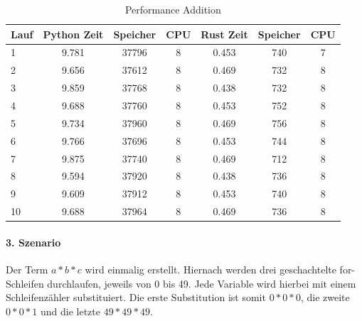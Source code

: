 \documentclass[11pt,a4paper, ngerman]{article}
\begin{document}
\begin{table}[ht!]
    \caption{Performance Addition}
    \centering
    \begin{tabular}{|l|c|c|c|c|c|c|}
        \hline
        \textbf{Lauf} & \textbf{Python Zeit} & \textbf{Speicher} & \textbf{CPU} & \textbf{Rust Zeit} & \textbf{Speicher} & \textbf{CPU} \\
        \hline
        1 & 9.781 & 37796 & 8 & 0.453 & 740 & 7 \\
        \hline
        2 & 9.656 & 37612 & 8 & 0.469 & 732 & 8 \\
        \hline
        3 & 9.859 & 37768 & 8 & 0.438 & 732 & 8 \\
        \hline
        4 & 9.688 & 37760 & 8 & 0.453 & 752 & 8 \\
        \hline
        5 & 9.734 & 37960 & 8 & 0.469 & 756 & 8 \\
        \hline
        6 & 9.766 & 37696 & 8 & 0.453 & 744 & 8 \\
        \hline
        7 & 9.875 & 37740 & 8 & 0.469 & 712 & 8 \\
        \hline
        8 & 9.594 & 37920 & 8 & 0.438 & 736 & 8 \\
        \hline
        9 & 9.609 & 37912 & 8 & 0.453 & 740 & 8 \\
        \hline
        10 & 9.688 & 37964 & 8 & 0.469 & 736 & 8 \\
        \hline
    \end{tabular}
\end{table}

\newpage

\paragraph{3. Szenario} Der Term $a*b*c$ wird einmalig erstellt. Hiernach werden drei geschachtelte for-Schleifen durchlaufen, jeweils von 0 bis 49. Jede Variable wird hierbei mit einem Schleifenzähler substituiert. Die erste Substitution ist somit $0*0*0$, die zweite $0*0*1$ und die letzte $49*49*49$.
\end{document}
